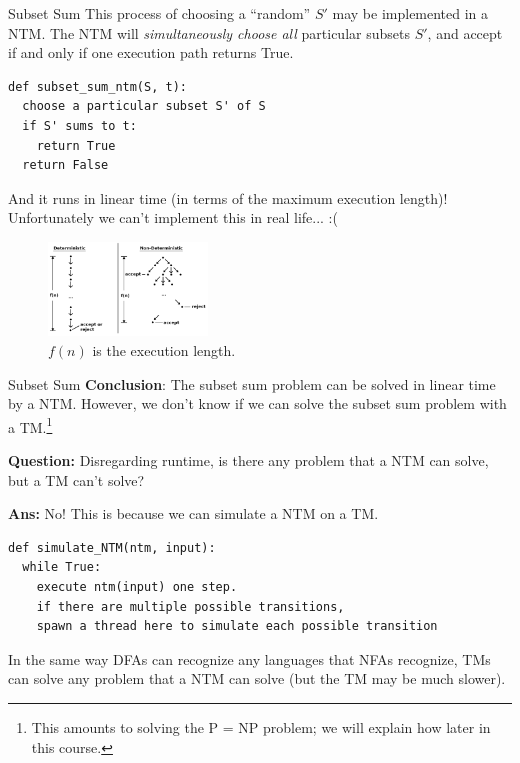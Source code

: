 \documentclass{beamer}
\begin{document}
\begin{frame}[fragile]{Subset Sum}
This process of choosing a ``random'' $S'$ may be implemented in a NTM. The NTM will \textit{simultaneously choose all} particular subsets $S'$, and accept if and only if one execution path returns True.

\begin{verbatim}
def subset_sum_ntm(S, t):
  choose a particular subset S' of S
  if S' sums to t:
    return True
  return False
\end{verbatim}

And it runs in linear time (in terms of the maximum execution length)! Unfortunately we can't implement this in real life... :(

\begin{figure}[h]
    \centering
    \includegraphics[height=2.5cm]{img/NTM.png}
    \caption*{$f(n)$ is the execution length.}
\end{figure}

\end{frame}

\begin{frame}[fragile]{Subset Sum}
\textbf{Conclusion}: The subset sum problem can be solved in linear time by a NTM. However, we don't know if we can solve the subset sum problem with a TM.\footnote{This amounts to solving the P = NP problem; we will explain how later in this course.} 

\pause

\textbf{Question:} Disregarding runtime, is there any problem that a NTM can solve, but a TM can't solve?

\pause

\textbf{Ans:} No! This is because we can simulate a NTM on a TM.

\begin{verbatim}
def simulate_NTM(ntm, input):
  while True:
    execute ntm(input) one step.
    if there are multiple possible transitions, 
    spawn a thread here to simulate each possible transition
\end{verbatim}

In the same way DFAs can recognize any languages that NFAs recognize, TMs can solve any problem that a NTM can solve (but the TM may be much slower).
\end{frame}
\end{document}
